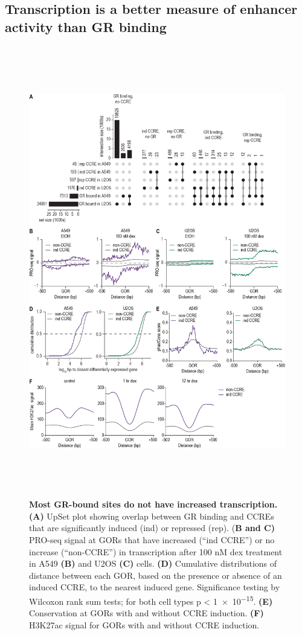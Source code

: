\documentclass{article}
\begin{document}
{\subsection*{Transcription is a better measure of enhancer activity than GR binding}

\begin{figure}[ht]
\includegraphics[height=7.75in]{figures/Figure5_2021-04.png}
\caption{\textbf{Most GR-bound sites do not have increased transcription. (A)} UpSet plot showing overlap between GR binding and CCREs that are significantly induced (ind) or repressed (rep). (\textbf{B and C)} PRO-seq signal at GORs that have increased (“ind CCRE”) or no increase (“non-CCRE”) in transcription after 100 nM dex treatment in A549 \textbf{(B)} and U2OS \textbf{(C)} cells. \textbf{(D)} Cumulative distributions of distance between each GOR, based on the presence or absence of an induced CCRE, to the nearest induced gene. Significance testing by Wilcoxon rank sum tests; for both cell types p < \num{1e-15}. \textbf{(E)} Conservation at GORs with and without CCRE induction. \textbf{(F)} H3K27ac signal for GORs with and without CCRE induction.}
\label{fig:fig5}
\end{figure}

}
\end{document}
